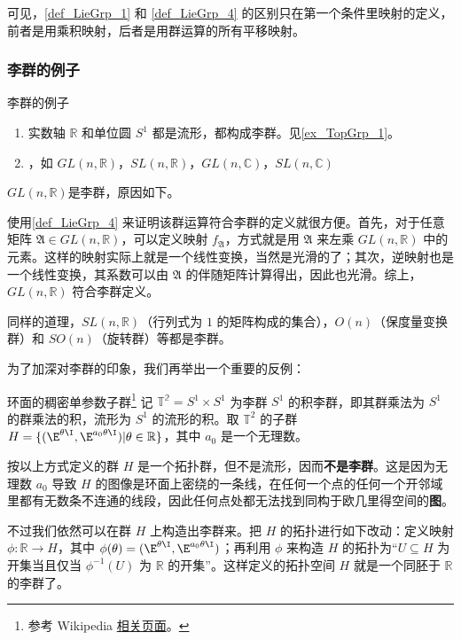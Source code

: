 可见，\autoref{def_LieGrp_1} 和 \autoref{def_LieGrp_4} 的区别只在第一个条件里映射的定义，前者是用乘积映射，后者是用群运算的所有平移映射。

\subsubsection{李群的例子}

\begin{example}{李群的例子}
\begin{enumerate}
\item 实数轴 $\mathbb{R}$ 和单位圆 $S^1$ 都是流形，都构成李群。见\autoref{ex_TopGrp_1}。
\item {}，如 $GL(n, \mathbb{R})$，$SL(n, \mathbb{R})$，$GL(n, \mathbb{C})$，$SL(n, \mathbb{C})$
\end{enumerate}
\end{example}

$GL(n, \mathbb{R})$是李群，原因如下。

使用\autoref{def_LieGrp_4} 来证明该群运算符合李群的定义就很方便。首先，对于任意矩阵 $\mathfrak{A} \in GL(n, \mathbb{R})$，可以定义映射 $f_\mathfrak{A}$，方式就是用 $\mathfrak{A}$ 来左乘 $GL(n, \mathbb{R})$ 中的元素。这样的映射实际上就是一个线性变换，当然是光滑的了；其次，逆映射也是一个线性变换，其系数可以由 $\mathfrak{A}$ 的伴随矩阵计算得出，因此也光滑。综上，$GL(n, \mathbb{R})$ 符合李群定义。

同样的道理，$SL(n, \mathbb{R})$（行列式为 $1$ 的矩阵构成的集合），$O(n)$（保度量变换群）和 $SO(n)$（旋转群）等都是李群。

为了加深对李群的印象，我们再举出一个重要的反例：

\begin{example}{环面的稠密单参数子群\footnote{参考 Wikipedia \href{https://en.wikipedia.org/wiki/Lie_group}{相关页面}。}}\label{ex_LieGrp_1}
记 $\mathbb{T^2}=S^1\times S^1$ 为李群 $S^1$ 的积李群，即其群乘法为 $S^1$ 的群乘法的积，流形为 $S^1$ 的流形的积。取 $\mathbb{T}^2$ 的子群 $H=\{(\E^{\theta\I}, \E^{a_0\theta\I})|\theta\in\mathbb{R}\}$，其中 $a_0$ 是一个无理数。

按以上方式定义的群 $H$ 是一个拓扑群，但不是流形，因而\textbf{不是李群}。这是因为无理数 $a_0$ 导致 $H$ 的图像是环面上密绕的一条线，在任何一个点的任何一个开邻域里都有无数条不连通的线段，因此任何点处都无法找到同构于欧几里得空间的\textbf{图}。

不过我们依然可以在群 $H$ 上构造出李群来。把 $H$ 的拓扑进行如下改动：定义映射 $\phi:\mathbb{R}\to H$，其中 $\phi(\theta)=(\E^{\theta\I}, \E^{a_0\theta\I})$；再利用 $\phi$ 来构造 $H$ 的拓扑为“$U\subseteq H$ 为开集当且仅当 $\phi^{-1}(U)$ 为 $\mathbb{R}$ 的开集”。这样定义的拓扑空间 $H$ 就是一个同胚于 $\mathbb{R}$ 的李群了。
\end{example}

